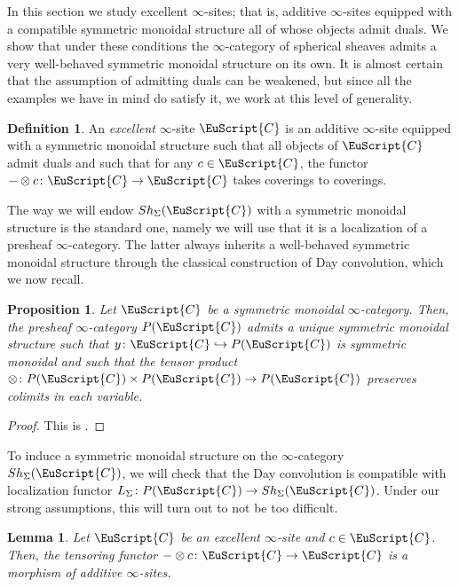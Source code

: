 \documentclass[oneside,a4paper]{amsart}
\newcommand{\euscr}[1]{\EuScript{#1}} %
\newcommand{\ccat}{\euscr{C}} %
\theoremstyle{plain}
\newtheorem{lemma}[thm]{Lemma}
\newtheorem{prop}[thm]{Proposition}
\theoremstyle{definition}
\newtheorem{defin}[thm]{Definition}
\theoremstyle{remark}
\begin{document}
In this section we study excellent $\infty$-sites; that is, additive $\infty$-sites equipped with a compatible symmetric monoidal structure all of whose objects admit duals. We show that under these conditions the $\infty$-category of spherical sheaves admits a very well-behaved symmetric monoidal structure on its own. It is almost certain that the assumption of admitting duals can be weakened, but since all the examples we have in mind do satisfy it, we work at this level of generality. 

\begin{defin}
\label{defin:excellent_infty_site}
An \emph{excellent} $\infty$-site $\ccat$ is an additive $\infty$-site equipped with a symmetric monoidal structure such that all objects of $\ccat$ admit duals and such that for any $c \in \ccat$, the functor $- \otimes c \colon \ccat \rightarrow \ccat$ takes coverings to coverings. 
\end{defin}

The way we will endow $Sh_{\Sigma}(\ccat)$ with a symmetric monoidal structure is the standard one, namely we will use that it is a localization of a presheaf $\infty$-category. The latter always inherits a well-behaved symmetric monoidal structure through the classical construction of Day convolution, which we now recall. 

\begin{prop}
\label{prop:symmetric_monoidal_structure_on_presheaves}
Let $\ccat$ be a symmetric monoidal $\infty$-category. Then, the presheaf $\infty$-category $P(\ccat)$ admits a unique symmetric monoidal structure such that $y \colon \ccat \hookrightarrow P(\ccat)$ is symmetric monoidal and such that the tensor product $\otimes \colon P(\ccat) \times P(\ccat) \rightarrow P(\ccat)$ preserves colimits in each variable.
\end{prop}

\begin{proof}
This is \cite[4.8.1]{higher_algebra}.
\end{proof}
To induce a symmetric monoidal structure on the $\infty$-category $Sh_{\Sigma}(\ccat)$, we will check that the Day convolution is compatible with localization functor $L_{\Sigma} \colon P(\ccat) \rightarrow Sh_{\Sigma}(\ccat)$. Under our strong assumptions, this will turn out to not be too difficult. 

\begin{lemma}
\label{lemma:tensoring_with_an_object_in_excellent_infty_site_a_morphism_of_additive_sites}
Let $\ccat$ be an excellent $\infty$-site and $c \in \ccat$. Then, the tensoring functor $- \otimes c \colon \ccat \rightarrow \ccat$ is a morphism of additive $\infty$-sites. 
\end{lemma}
\end{document}
